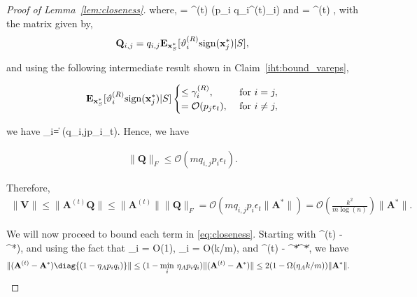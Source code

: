 \documentclass{article}
\newcommand{\sgn}{{\rm sign}}
\def\[#1\]{{$#1$}}
\def\b#1{{\mathbf{#1}}}
\begin{document}
\begin{proof}[Proof of Lemma~\ref{lem:closeness}]
	where, \[\b{U} =  \b{A}^{(t)} \diag({p_i q_i\lambda^{(t)}_i}) \] and \[\b{V}  = \b{A}^{(t)} \b{Q}\], with the matrix \[\b{Q}\] given by,
	\begin{align*}
	\b{Q}_{i,j} = q_{i,j}\b{E}_{\b{x}_S^*}[\vartheta^{(R)}_i\sgn(\b{x}^*_{j})|S],
	
	
	
	
	\end{align*}
	
	and using  the following intermediate result shown in Claim~\ref{iht:bound_vareps},


















		\begin{align*}
		\b{E}_{\b{x}_S^*}[\vartheta^{(R)}_{i}\sgn(\b{x}^*_{j})|S] 
		\begin{cases}
		\leq  \gamma^{(R)}_i, & ~\text{for}~ i = j, \\
		 = \mathcal{O}(p_{j}\epsilon_t ),& ~\text{for}~ i \neq j,
		\end{cases}
		\end{align*}
		
	  we have \[\|\b{Q}_i\| = (q_{i,j}p_{i}\epsilon_t)\]. Hence, we have
	
	
	
	
	
	
	\begin{align*}
	\|\b{Q}\|_F \leq   \mathcal{O}(mq_{i,j}p_{i}\epsilon_t).
	
	\end{align*}
	
	Therefore,
	\begin{align*}
	\|\b{V}\| \leq \|\b{A}^{(t)} \b{Q}\| \leq 	\|\b{A}^{(t)}\| \|\b{Q}\|_F = \mathcal{O}(mq_{i,j}p_{i}\epsilon_t \|\b{A}^*\|) = \mathcal{O}(\tfrac{k^2}{m \log(n)}) \|\b{A}^*\|. 
	\end{align*}
	
	
	
	
	
	
	We will now proceed to bound each term in \eqref{eq:closeness}. Starting with \[(\b{A}^{(t)} - \b{A}^*)\], and using the fact that \[p_i = O(1)\], \[q_i = O(k/m)\], and \[\|\b{A}^{(t)} - \b{A}^*\| \|\b{A}^*\|\], we have
	\begin{align*}
	\|(\b{A}^{(t)} - \b{A}^*)\diag{(1 - \eta_A p_i q_i)}\| &\leq (1 - \underset{i}{\min}~\eta_A p_i q_i)\|(\b{A}^{(t)} - \b{A}^*)\| 
	\leq 2(1 -  \Omega(\eta_A k/m))\|\b{A}^*\|.
	\end{align*}
	

\end{proof}
\end{document}
